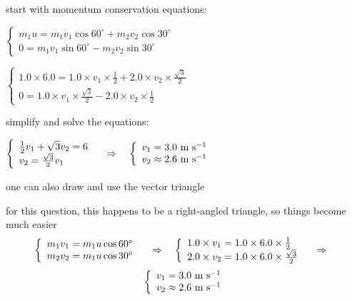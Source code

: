 
\begin{soln} start with momentum conservation equations:

\eqskip$\left\{\begin{array}{l}
	m_1 u = m_1 v_1 \cos60^\circ + m_2 v_2 \cos30^\circ \\
	0 = m_1 v_1 \sin60^\circ - m_2 v_2 \sin30^\circ
	\end{array} \right. $

\eqskip $ \left\{\begin{array}{l}
	1.0\times6.0 = 1.0 \times v_1 \times \frac{1}{2} + 2.0 \times v_2 \times \frac{\sqrt{3}}{2}  \\
	0 = 1.0 \times v_1 \times \frac{\sqrt{3}}{2} - 2.0 \times v_2 \times \frac{1}{2}
	\end{array} \right. $

\eqyskip simplify and solve the equations:

\eqskip $ \left\{\begin{array}{l}
\frac{1}{2} v_1 + \sqrt{3} v_2 = 6 \\
v_2 =  \frac{\sqrt{3}}{2} v_1
\end{array} \right. \quad \Rightarrow \quad 
\left\{\begin{array}{l}
v_1 = 3.0 \text{ m s$^{-1}$} \\
v_2 \approx 2.6 \text{ m s$^{-1}$}
\end{array} \right.$

\eqyskip one can also draw and use the vector triangle

for this question, this happens to be a right-angled triangle, so things become much easier
\begin{equation*}
	\left\{\begin{array}{l}
	m_1 v_1 = m_1 u \cos 60^\circ \\
	m_2 v_2 = m_1 u \cos 30^\circ
	\end{array} \right. \quad \Rightarrow \quad 
	\left\{\begin{array}{l}
	1.0\times v_1 = 1.0 \times 6.0 \times \frac{1}{2} \\
	2.0\times v_2 = 1.0 \times 6.0 \times \frac{\sqrt{3}}{2}
	\end{array} \right.	\quad \Rightarrow \quad 
\end{equation*}
\begin{equation*}
	\left\{\begin{array}{l}
	v_1 = 3.0 \text{ m s$^{-1}$} \\
	v_2 \approx 2.6 \text{ m s$^{-1}$}
	\end{array} \right.  
\end{equation*}
\end{soln}



